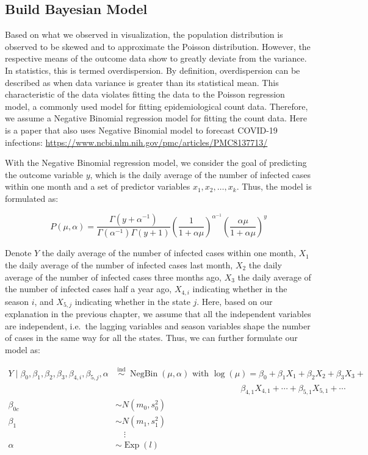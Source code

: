 \documentclass[
]{book}
\begin{document}
\hypertarget{build-bayesian-model}{%
\subsection{Build Bayesian Model}\label{build-bayesian-model}}

Based on what we observed in visualization, the population distribution is observed to be skewed and to approximate the Poisson distribution. However, the respective means of the outcome data show to greatly deviate from the variance. In statistics, this is termed overdispersion. By definition, overdispersion can be described as when data variance is greater than its statistical mean. This characteristic of the data violates fitting the data to the Poisson regression model, a commonly used model for fitting epidemiological count data. Therefore, we assume a Negative Binomial regression model for fitting the count data. Here is a paper that also uses Negative Binomial model to forecast COVID-19 infections: \url{https://www.ncbi.nlm.nih.gov/pmc/articles/PMC8137713/}

With the Negative Binomial regression model, we consider the goal of predicting the outcome variable \(y\), which is the daily average of the number of infected cases within one month and a set of predictor variables \(x_{1},x_{2},\dots,x_{k}\). Thus, the model is formulated as:

\[
P\left(\mu, \alpha\right)=\frac{\Gamma\left(y+\alpha^{-1}\right)}{\Gamma\left(\alpha^{-1}\right) \Gamma\left(y+1\right)}\left(\frac{1}{1+\alpha \mu}\right)^{\alpha^{-1}}\left(\frac{\alpha \mu}{1+\alpha \mu}\right)^{y}
\]

Denote \(Y\) the daily average of the number of infected cases within one month, \(X_{1}\) the daily average of the number of infected cases last month, \(X_2\) the daily average of the number of infected cases three months ago, \(X_3\) the daily average of the number of infected cases half a year ago, \(X_{4,i}\) indicating whether in the season \(i\), and \(X_{5,j}\) indicating whether in the state \(j\). Here, based on our explanation in the previous chapter, we assume that all the independent variables are independent, i.e.~the lagging variables and season variables shape the number of cases in the same way for all the states. Thus, we can further formulate our model as:

\[
\begin{aligned}
Y \mid \beta_{0}, \beta_{1}, \beta_{2}, \beta_{3}, \beta_{4,i}, \beta_{5,j}, \alpha & \stackrel{\text { ind }}{\sim} \operatorname{NegBin}\left(\mu, \alpha\right) \text { with } \log \left(\mu\right)=\beta_{0}+\beta_{1} X_{1}+\beta_{2} X_{2} + \beta_3X_{3}+\\&\qquad\qquad\qquad\qquad\qquad\qquad\qquad\text{ } \beta_{4,1}X_{4,1} +\cdots + \beta_{5,1}X_{5,1} + \cdots \\
\beta_{0 c} & \sim N\left(m_0, s_0^2\right) \\
\beta_{1} & \sim N\left(m_1, s_1^2\right) \\
&\quad\vdots\\
\alpha & \sim \operatorname{Exp}(l)
\end{aligned}
\]
\end{document}
